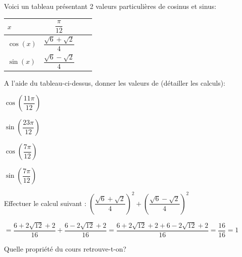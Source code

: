\documentclass[11pt,a4paper]{article}  %
\begin{document}

Voici un tableau présentant 2 valeurs particulières de cosinus et sinus:\\
\begin{center}
	\begin{tabular}{ | Xc | Xc | }
		\hline
		$x$  & $\dfrac{\pi}{12}$ \rule[-12pt]{0pt}{33pt}\\ \hline
		$\cos(x)$  & $\dfrac{\sqrt{6}+\sqrt{2}}{4}$ \rule[-12pt]{0pt}{33pt}\\ \hline
		$\sin(x)$ & $\dfrac{\sqrt{6}-\sqrt{2}}{4}$  \rule[-12pt]{0pt}{33pt}\\
		\hline  
	\end{tabular}
\end{center}

\begin{enumMet}
	\item A l'aide du tableau-ci-dessus, donner les valeurs de (détailler les calculs):
	\begin{enumMet}
		\item $\cos\left(\dfrac{11\pi}{12}\right)$\quad {}
		\item {} $\sin\left(\dfrac{23\pi}{12}\right)$\quad {}
		\item $\cos\left(\dfrac{7\pi}{12}\right)$ \quad {}
		\item {} $\sin\left(\dfrac{7\pi}{12}\right)$ \quad {}
	\end{enumMet}
	\item 
	\begin{enumMet}
		\item Effectuer le calcul suivant : $\left(\dfrac{\sqrt{6}+\sqrt{2}}{4}\right)^2+\left(\dfrac{\sqrt{6}-\sqrt{2}}{4}\right)^2$
		\begin{corrBox}
			$=\dfrac{6+2\sqrt{12}+2}{16}+\dfrac{6-2\sqrt{12}+2}{16}=\dfrac{6+2\sqrt{12}+2+6-2\sqrt{12}+2}{16}=\dfrac{16}{16}=1$
		\end{corrBox}
		\item Quelle propriété du cours retrouve-t-on? \quad \corr{$\cos^2 x + \sin^2 x = 1$}
	\end{enumMet}
\end{enumMet}
\end{document}
